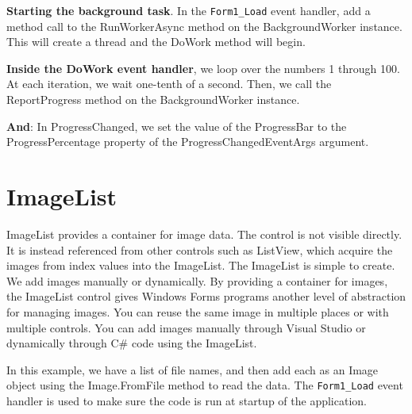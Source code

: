 



\textbf{Starting the background task}. In the \verb*|Form1_Load| event handler, add a method call to the
RunWorkerAsync method on the BackgroundWorker instance. This will create a thread and the
DoWork method will begin.

\textbf{Inside the DoWork event handler}, we loop over the numbers 1 through 100. At each iteration, we
wait one-tenth of a second. Then, we call the ReportProgress method on the BackgroundWorker
instance.

\textbf{And}: In ProgressChanged, we set the value of the ProgressBar to the ProgressPercentage property
of the ProgressChangedEventArgs argument.

\section{ImageList}
ImageList provides a container for image data. The control is not visible directly. It is instead
referenced from other controls such as ListView, which acquire the images from index values into
the ImageList. The ImageList is simple to create. We add images manually or dynamically. By
providing a container for images, the ImageList control gives Windows Forms programs another
level of abstraction for managing images. You can reuse the same image in multiple places or with
multiple controls. You can add images manually through Visual Studio or dynamically through C\#
code using the ImageList.

In this example, we have a list of file names, and then add each as an Image object using the
Image.FromFile method to read the data. The \verb*|Form1_Load| event handler is used to make sure the
code is run at startup of the application.


